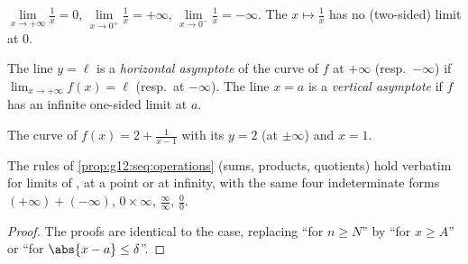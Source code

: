 \begin{example}
$\lim\limits_{x\to+\infty} \frac{1}{x} = 0$,
$\lim\limits_{x\to 0^+} \frac{1}{x} = +\infty$,
$\lim\limits_{x\to 0^-} \frac{1}{x} = -\infty$. The 
$x \mapsto \frac1x$ has no (two-sided) limit at $0$.
\end{example}

\begin{definition}[Asymptotes]\label{def:g12:limcont:asymptote}
The line $y = \ell$ is a \emph{horizontal asymptote} of the
curve of $f$ at $+\infty$ (resp.\ $-\infty$) if
$\lim_{x\to+\infty} f(x) = \ell$ (resp.\ at $-\infty$). The line $x = a$ is a
\emph{vertical asymptote} if $f$ has an infinite one-sided limit at $a$.
\end{definition}

\begin{omfigure}

{\small The curve of $f(x) = 2 + \frac{1}{x-1}$ with its  $y = 2$ (at $\pm\infty$) and  $x = 1$.}
\end{omfigure}

\begin{proposition}\label{prop:g12:limcont:operations}
The rules of \cref{prop:g12:seq:operations} (sums, products, quotients) hold
verbatim for limits of , at a point or at infinity, with the same
four indeterminate forms $(+\infty)+(-\infty)$, $0\times\infty$,
$\frac{\infty}{\infty}$, $\frac{0}{0}$.
\end{proposition}

\begin{proof}
The proofs are identical to the  case, replacing ``for $n \geq N$''
by ``for $x \geq A$'' or ``for $\abs{x-a} \leq \delta$''.
\end{proof}

